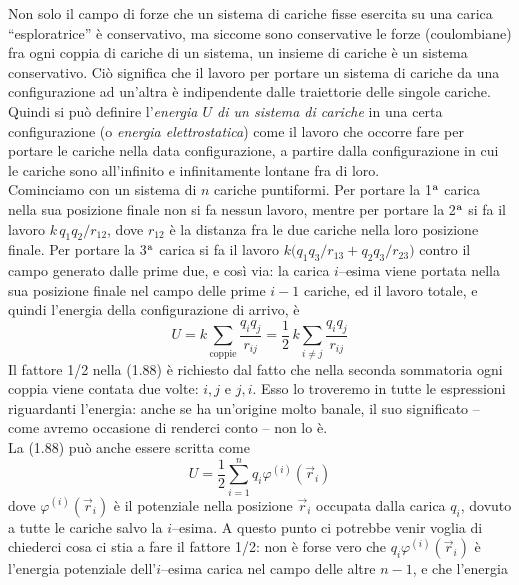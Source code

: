 Non solo il campo di forze che un sistema di cariche fisse esercita su una
carica ``esploratrice'' \`e conservativo, ma siccome sono conservative le forze
(coulombiane) fra ogni coppia di cariche di un sistema, un insieme di cariche
\`e un sistema conservativo. Ci\`o significa che il lavoro per portare un
sistema di cariche da una configurazione ad un'altra \`e indipendente dalle
traiettorie delle singole cariche.\\
Quindi si pu\`o definire l'\emph{energia $U$ di un sistema di cariche} in una
certa configurazione (o \emph{energia elettrostatica}) come il lavoro che
occorre fare per portare le cariche nella data configurazione, a partire dalla
configurazione in cui le cariche sono all'infinito e infinitamente lontane fra
di loro.\\
Cominciamo con un sistema di $n$ cariche puntiformi. Per portare la 1$^{\rm a}$
carica nella sua posizione finale non si fa nessun lavoro, mentre per portare la
2$^{\rm a}$ si fa il lavoro $k\,q_1q_2/r_{12}$, dove $r_{12}$ \`e la distanza
fra le due cariche nella loro posizione finale. Per portare la 3$^{\rm a}$
carica si fa il lavoro $k\big(q_1q_3/r_{13}+q_2q_3/r_{23}\big)$ contro il campo
generato dalle prime due, e cos\`i via: la carica $i$--esima viene portata nella
sua posizione finale nel campo delle prime $i-1$ cariche, ed il lavoro totale, e
quindi l'energia della configurazione di arrivo, \`e
\begin{equation}
  U=k\sum_{\text{coppie}}\frac{q_iq_j}{r_{ij}}
  =\frac12\,k\sum_{i\neq j}\frac{q_iq_j}{r_{ij}}
  \tag{1.88}
\end{equation}
Il fattore 1/2 nella (1.88) \`e richiesto dal fatto che nella seconda sommatoria
ogni coppia viene contata due volte: $i,j$ e $j,i$. Esso lo troveremo in tutte
le espressioni riguardanti l'energia: anche se ha un'origine molto banale, il
suo significato -- come avremo occasione di renderci conto -- non lo \`e.\\
La (1.88) pu\`o anche essere scritta come
\begin{equation}
  U=\frac12\sum_{i=1}^nq_i\varphi^{(i)}(\vec r_i)
  \tag{1.89}
\end{equation}
dove $\varphi^{(i)}(\vec r_i)$ \`e il potenziale nella posizione $\vec r_i$
occupata dalla carica $q_i$, dovuto a tutte le cariche salvo la $i$--esima. A
questo punto ci potrebbe venir voglia di chiederci cosa ci stia a fare il
fattore 1/2: non \`e forse vero che $q_i\varphi^{(i)}(\vec r_i)$ \`e l'energia
potenziale dell'$i$--esima carica nel campo delle altre $n-1$, e che l'energia
